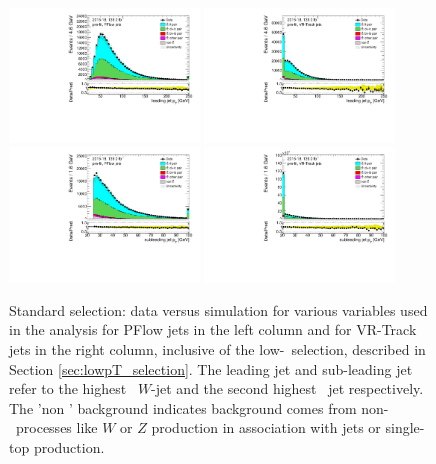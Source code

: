 \documentclass[letterpaper,12pt]{article}
\begin{document}
\begin{figure}[H]
	\centering
	\includegraphics[width=0.45\textwidth]{FTAG_plots/pretagNoRwwithouthighpTPFlowall/DataMC_h_J0_pt.pdf}
	\includegraphics[width=0.45\textwidth]{FTAG_plots/pretagNoRwwithouthighpTVRJetsall/DataMC_h_J0_pttrackjet.pdf}\\
	\includegraphics[width=0.45\textwidth]{FTAG_plots/pretagNoRwwithouthighpTPFlowall/DataMC_h_J1_pt.pdf}
	\includegraphics[width=0.45\textwidth]{FTAG_plots/pretagNoRwwithouthighpTVRJetsall/DataMC_h_J1_pttrackjet.pdf}\\
	\caption{Standard selection: data versus simulation for various variables used in the analysis for 
	PFlow jets in the left column and for VR-Track jets in the right column, 
	inclusive of the low-\pt\ selection, described in Section \ref{sec:lowpT_selection}. 
	The leading jet and sub-leading jet refer to the highest \pt\ $W$-jet and the 
	second highest \pt\ jet respectively. The 'non \ttbar' background 
	indicates background comes from non-\ttbar\ processes like $W$ or $Z$ production
	in association with jets or single-top production. }
	\label{fig:kinematic_distributions_standard}
\end{figure}
\end{document}
